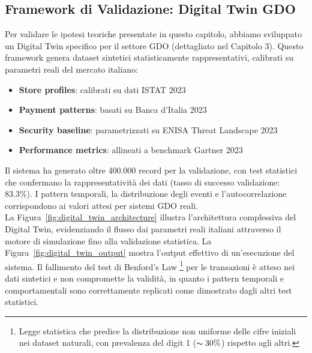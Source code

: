 \subsection{\texorpdfstring{\textbf{Framework di Validazione: Digital Twin GDO}}{2.1.1 - Framework di Validazione: Digital Twin GDO}}

Per validare le ipotesi teoriche presentate in questo capitolo, 
abbiamo sviluppato un Digital Twin specifico per il settore GDO 
(dettagliato nel Capitolo 3). Questo framework genera dataset 
sintetici statisticamente rappresentativi, calibrati su parametri 
reali del mercato italiano:

\begin{itemize}
    \item \textbf{Store profiles}: calibrati su dati ISTAT 2023
    \item \textbf{Payment patterns}: basati su Banca d'Italia 2023
    \item \textbf{Security baseline}: parametrizzati su ENISA Threat Landscape 2023
    \item \textbf{Performance metrics}: allineati a benchmark Gartner 2023
\end{itemize}

Il sistema ha generato oltre 400.000 record per la validazione, 
con test statistici che confermano la rappresentatività dei dati 
(tasso di successo validazione: 83.3\%). I pattern temporali, 
la distribuzione degli eventi e l'autocorrelazione corrispondono 
ai valori attesi per sistemi GDO reali.\\
La Figura~\ref{fig:digital_twin_architecture} illustra l'architettura 
complessiva del Digital Twin, evidenziando il flusso dai parametri reali 
italiani attraverso il motore di simulazione fino alla validazione statistica. 
La Figura~\ref{fig:digital_twin_output} mostra l'output effettivo di 
un'esecuzione del sistema.
Il fallimento del test di Benford's Law \footnote{Legge statistica che predice 
la distribuzione non uniforme delle cifre iniziali nei dataset naturali, con 
prevalenza del digit 1 ($\thicksim 30\%$) rispetto agli altri.} per le transazioni è atteso nei 
dati sintetici e non compromette la validità, in quanto i pattern temporali e comportamentali sono correttamente replicati come dimostrato dagli altri test statistici.

